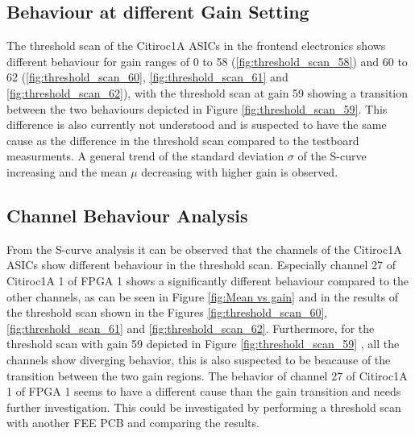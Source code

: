 \subsection{Behaviour at different Gain Setting}
The threshold scan of the Citiroc1A ASICs in the frontend electronics shows different behaviour for gain ranges of 0 to 58 (\ref{fig:threshold_scan_58}) and 60 to 62 (\ref{fig:threshold_scan_60}, \ref{fig:threshold_scan_61} and \ref{fig:threshold_scan_62}),
with the threshold scan at gain 59 showing a transition between the two behaviours depicted in Figure \ref{fig:threshold_scan_59}.
This difference is also currently not understood and is suspected to have the same cause as the difference in the threshold scan compared to the testboard measurments. 
\newline
A general trend of the standard deviation $\sigma$ of the S-curve increasing and the mean $\mu$ decreasing with higher gain is observed.
\subsection{Channel Behaviour Analysis}
From the S-curve analysis it can be observed that the channels of the Citiroc1A ASICs show different behaviour in the threshold scan.
\newline
Especially channel 27 of Citiroc1A 1 of FPGA 1 shows a significantly different behaviour compared to the other channels,
as can be seen in Figure \ref{fig:Mean vs gain} and in the results of the threshold scan shown in the Figures \ref{fig:threshold_scan_60}, \ref{fig:threshold_scan_61} and \ref{fig:threshold_scan_62}.
\newline
Furthermore, for the threshold scan with gain 59 depicted in Figure \ref{fig:threshold_scan_59} , all the channels show diverging behavior, this is also suspected to be beacause of the transition between the two gain regions.
\newline
The behavior of channel 27 of Citiroc1A 1 of FPGA 1 seems to have a different cause than the gain transition and needs further investigation.
This could be investigated by performing a threshold scan with another FEE PCB and comparing the results.
